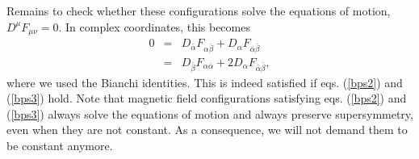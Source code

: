 \documentclass[a4paper,12pt,oneside]{article}
\begin{document}
Remains to check whether these configurations solve the equations of 
motion, $D^\mu F_{\mu \nu}=0$. In complex coordinates, this becomes
\begin{eqnarray}
0&=&D_{\bar\alpha }F_{\alpha \bar\beta}+D_{\alpha }F_{\bar\alpha 
\bar\beta}\nonumber\\
&=&D_{\bar\beta}F_{\alpha \bar\alpha }+2D_{\alpha }F_{\bar\alpha 
\bar\beta}, 
\end{eqnarray}
where we used the Bianchi identities. This is indeed satisfied if 
eqs. (\ref{bps2}) and (\ref{bps3}) hold. Note that magnetic field 
configurations satisfying eqs. (\ref{bps2}) and (\ref{bps3}) always solve 
the equations of motion and always preserve supersymmetry, even when they 
are not constant. As a consequence, we will not demand them to be constant 
anymore.

\setcounter{equation}{0}
\end{document}
